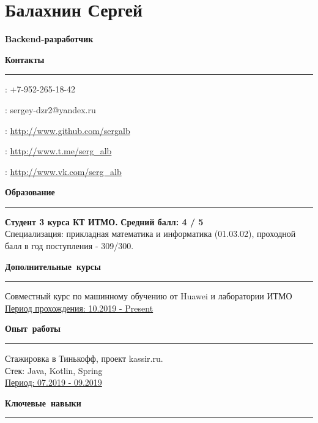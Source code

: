 \documentclass[12pt, a4paper]{report}
\author{Балахнин Сергей}
\begin{document}
    \section*{Балахнин Сергей}

    {\large\textbf{Backend-разработчик}}

    \hbox{\large\textbf{Контакты}}\kern5pt\hrule\kern5pt

    \faPhone: +7-952-265-18-42

    \Letter: sergey-dzr2@yandex.ru

    \faGithub: \url{http://www.github.com/sergalb}

    \faSend: \url{http://www.t.me/serg\_alb}

    \faVk: \url{http://www.vk.com/serg_alb} \\



    \par\hbox{\large\textbf{Образование}}\kern5pt\hrule\kern5pt

    \textbf{Студент 3 курса КТ ИТМО.}
    \hfill
    \textbf{ Средний балл: 4 / 5} \\
    Специализация: прикладная математика и информатика (01.03.02), проходной балл в год поступления - 309/300.\\

    \par\hbox{\large\textbf{Дополнительные курсы}}\kern5pt\hrule\kern5pt
    Совместный курс по машинному обучению от Huawei и лаборатории ИТМО \\
    \underline{Период прохождения: 10.2019 - Present} \\


    \par\hbox{\large\textbf{Опыт работы}}\kern3pt\hrule\kern10pt

    Стажировка в Тинькофф, проект kassir.ru. \\
    Стек: Java, Kotlin, Spring \\
    \underline{Период: 07.2019 - 09.2019} \\


    \par\hbox{\large\textbf{Ключевые навыки}}\kern5pt\hrule\kern5pt
\end{document}
